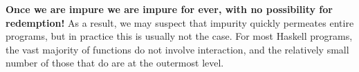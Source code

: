 \begin{blackbox}
  \textbf{Once we are impure we are impure for ever, with no possibility for redemption!}
  As a result, we may suspect that impurity quickly permeates entire programs, but in practice this is usually not the case.
  For most Haskell programs, the vast majority of functions do not involve interaction, and the relatively small number of those that do are at the outermost level.
\end{blackbox}

